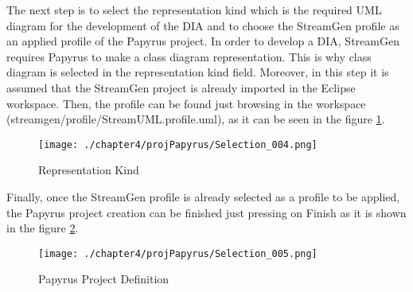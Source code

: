 The next step is to select the representation kind which is the required UML diagram for the development of the DIA and to choose the StreamGen profile as an applied profile of the Papyrus project. In order to develop a DIA, StreamGen requires Papyrus to make a class diagram representation. This is why class diagram is selected in the representation kind field. Moreover, in this step it is assumed that the StreamGen project is already imported in the Eclipse workspace. Then, the profile can be found just browsing in the workspace (streamgen/profile/StreamUML.profile.uml), as it can be seen in the figure \ref{fig:Representation Kind}.

\begin{figure}
\centering
{\texttt{[image: ./chapter4/projPapyrus/Selection\_004.png]}}
\caption{Representation Kind}
\label{fig:Representation Kind}
\end{figure}

Finally, once the StreamGen profile is already selected as a profile to be applied, the Papyrus project creation can be finished just pressing on Finish as it is shown in the figure \ref{fig:Papyrus Project Definition}.

\begin{figure}
\centering
{\texttt{[image: ./chapter4/projPapyrus/Selection\_005.png]}}
\caption{Papyrus Project Definition}
\label{fig:Papyrus Project Definition}
\end{figure}
